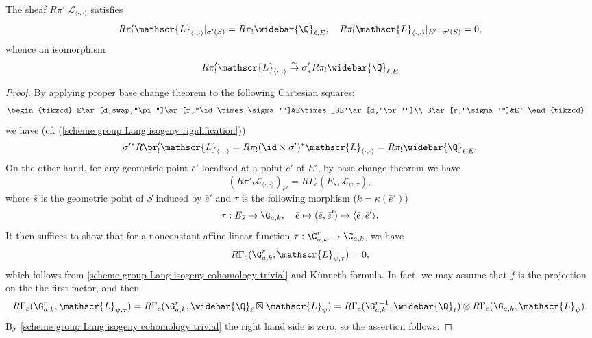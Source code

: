\begin{lemma}\label{scheme Fourier-Deligne transform of Q_l fiber prop}
The sheaf $R\pi'_!\mathscr{L}_{\langle\cdot,\cdot\rangle}$ satisfies 
\[R\pi'_!\mathscr{L}_{\langle\cdot,\cdot\rangle}|_{\sigma'(S)}=R\pi_!\widebar{\Q}_{\ell,E},\quad R\pi'_!\mathscr{L}_{\langle\cdot,\cdot\rangle}|_{E'-\sigma'(S)}=0,\]
whence an isomorphism
\[R\pi'_!\mathscr{L}_{\langle\cdot,\cdot\rangle}\stackrel{\sim}{\to}\sigma'_*R\pi_!\widebar{\Q}_{\ell,E}\]
\end{lemma}
\begin{proof}
By applying proper base change theorem to the following Cartesian squares:
\[\begin{tikzcd}
E\ar[d,swap,"\pi"]\ar[r,"\id\times\sigma'"]&E\times_SE'\ar[d,"\pr'"]\\
S\ar[r,"\sigma'"]&E'
\end{tikzcd}\quad\]
we have (cf. (\ref{scheme group Lang isogeny rigidification}))
\begin{gather*}
\sigma'^*R\pr'_!\mathscr{L}_{\langle\cdot,\cdot\rangle}=R\pi_!(\id\times\sigma')^*\mathscr{L}_{\langle\cdot,\cdot\rangle}=R\pi_!\widebar{\Q}_{\ell,E}.
\end{gather*}
On the other hand, for any geometric point $\bar{e}'$ localized at a point $e'$ of $E'$, by base change theorem we have
\[(R\pi'_!\mathscr{L}_{\langle\cdot,\cdot\rangle})_{\bar{e}'}=R\Gamma_c(E_{\bar{s}},\mathscr{L}_{\psi,\tau}),\]
where $\bar{s}$ is the geometric point of $S$ induced by $\bar{e}'$ and $\tau$ is the following morphism ($k=\kappa(\bar{e}')$)
\[\tau:E_{\bar{s}}\to\G_{a,k},\quad \bar{e}\mapsto(\bar{e},\bar{e}')\mapsto\langle\bar{e},\bar{e}'\rangle.\]
It then suffices to show that for a nonconstant affine linear function $\tau:\G_{a,k}^r\to\G_{a,k}$, we have
\[R\Gamma_c(\G_{a,k}^r,\mathscr{L}_{\psi,\tau})=0,\]
which follows from \cref{scheme group Lang isogeny cohomology trivial} and K\"unneth formula. In fact, we may assume that $f$ is the projection on the the first factor, and then
\[R\Gamma_c(\G_{a,k}^r,\mathscr{L}_{\psi,\tau})=R\Gamma_c(\G_{a,k}^r,\widebar{\Q}_\ell\boxtimes\mathscr{L}_{\psi})=R\Gamma_c(\G_{a,k}^{r-1},\widebar{\Q}_\ell)\otimes R\Gamma_c(\G_{a,k},\mathscr{L}_{\psi}).\]
By \cref{scheme group Lang isogeny cohomology trivial} the right hand side is zero, so the assertion follows.
\end{proof}

